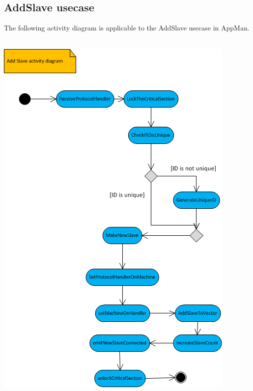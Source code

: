 \documentclass[a4paper,12pt,final]{article}
\begin{document}
\subsection{AddSlave usecase}
The following activity diagram is applicable to the AddSlave usecase in AppMan.\\
\textbf{\\}
\begin{center}
\includegraphics[scale=1]{AddSlaveActivity.png}
\end{center}



\newpage
\end{document}
